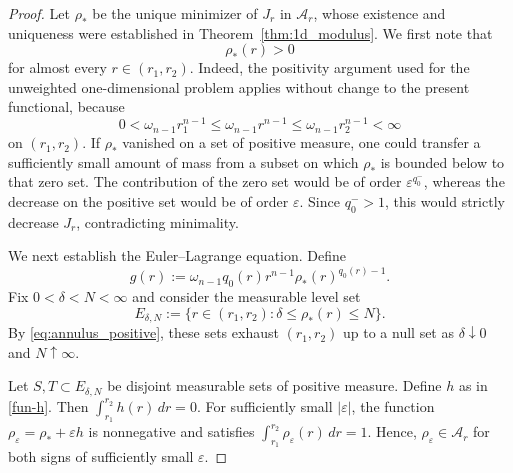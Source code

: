 \documentclass[10pt,a4paper]{amsart}
\begin{document}
\begin{proof}
Let $\rho_*$ be the unique minimizer of $J_r$ in $\mathcal A_r$, whose
existence and uniqueness were established in
Theorem~\ref{thm:1d_modulus}. We first note that
\begin{equation}
\label{eq:annulus_positive}
\rho_*(r)>0
\end{equation}
for almost every $r\in(r_1,r_2)$.
Indeed, the positivity argument used for the unweighted one-dimensional
problem applies without change to the present functional, because
\begin{equation*}
0<\omega_{n-1}r_1^{n-1}
\le
\omega_{n-1}r^{n-1}
\le
\omega_{n-1}r_2^{n-1}
<\infty
\end{equation*}
on $(r_1,r_2)$. If $\rho_*$ vanished on a set of positive measure, one
could transfer a sufficiently small amount of mass from a subset on
which $\rho_*$ is bounded below to that zero set. The contribution of
the zero set would be of order $\varepsilon^{q_0^-}$, whereas the
decrease on the positive set would be of order $\varepsilon$. Since
$q_0^->1$, this would strictly decrease $J_r$, contradicting minimality.

We next establish the Euler--Lagrange equation. Define
\begin{equation*}
g(r)
:=
\omega_{n-1}q_0(r)r^{n-1}
\rho_*(r)^{q_0(r)-1}.
\end{equation*}
Fix $0<\delta<N<\infty$ and consider the measurable level set
\begin{equation*}
E_{\delta,N}
:=
\{r\in(r_1,r_2):\delta\le\rho_*(r)\le N\}.
\end{equation*}
By \eqref{eq:annulus_positive}, these sets exhaust $(r_1,r_2)$ up to a
null set as $\delta\downarrow0$ and $N\uparrow\infty$.

Let $S,T\subset E_{\delta,N}$ be disjoint measurable sets of positive
measure. Define $h$ as in \eqref{fun-h}.
Then $\int_{r_1}^{r_2}h(r)\,dr=0.$
For sufficiently small $|\varepsilon|$, the function
$\rho_\varepsilon=\rho_*+\varepsilon h$
is nonnegative and satisfies
$\int_{r_1}^{r_2}\rho_\varepsilon(r)\,dr=1.$
Hence, $\rho_\varepsilon\in\mathcal A_r$ for both signs of sufficiently
small $\varepsilon$.


\end{proof}
\end{document}
